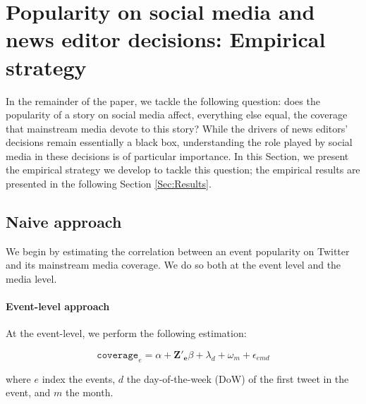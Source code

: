\section{Popularity on social media and news editor decisions: Empirical strategy\label{Sec:EmpiricalSpecification}}

In the remainder of the paper, we tackle the following question: does the popularity of a story on social media affect, everything else equal, the coverage that mainstream media devote to this story? While the drivers of news editors' decisions remain essentially a black box, understanding the role played by social media in these decisions is of particular importance. In this Section, we present the empirical strategy we develop to tackle this question; the empirical results are presented in the following Section \ref{Sec:Results}.


\subsection{Naive approach\label{Sec:SpecificationOLS}}

We begin by estimating the correlation between an event popularity on Twitter and its mainstream media coverage. We do so both at the event level and the media level.


\paragraph{Event-level approach}

At the event-level, we perform the following estimation:

\begin{equation}
\mathtt{coverage}_{e}= \alpha + \mathbf{Z'_{e}}\beta + \lambda_d + \omega_m + \epsilon_{emd}
\label{eq:OLSevent}
\end{equation}

\noindent  where $e$ index the events, $d$ the day-of-the-week (DoW) of the first tweet in the event, and $m$ the month.

